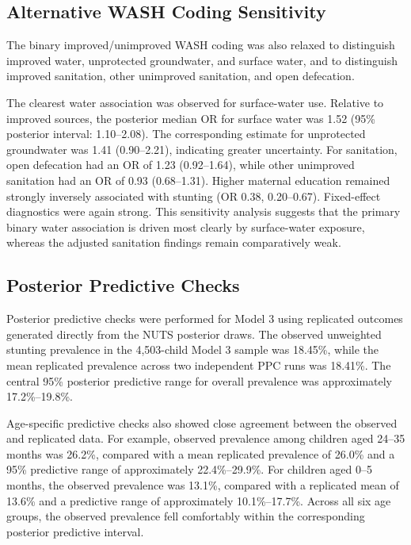 \subsection{Alternative WASH Coding Sensitivity}

The binary improved/unimproved WASH coding was also relaxed to distinguish improved water, unprotected groundwater, and surface water, and to distinguish improved sanitation, other unimproved sanitation, and open defecation.

The clearest water association was observed for surface-water use. Relative to improved sources, the posterior median OR for surface water was 1.52 (95\% posterior interval: 1.10--2.08). The corresponding estimate for unprotected groundwater was 1.41 (0.90--2.21), indicating greater uncertainty. For sanitation, open defecation had an OR of 1.23 (0.92--1.64), while other unimproved sanitation had an OR of 0.93 (0.68--1.31). Higher maternal education remained strongly inversely associated with stunting (OR 0.38, 0.20--0.67). Fixed-effect diagnostics were again strong. This sensitivity analysis suggests that the primary binary water association is driven most clearly by surface-water exposure, whereas the adjusted sanitation findings remain comparatively weak.

\subsection{Posterior Predictive Checks}

Posterior predictive checks were performed for Model 3 using replicated outcomes generated directly from the NUTS posterior draws. The observed unweighted stunting prevalence in the 4,503-child Model 3 sample was 18.45\%, while the mean replicated prevalence across two independent PPC runs was 18.41\%. The central 95\% posterior predictive range for overall prevalence was approximately 17.2\%--19.8\%.

Age-specific predictive checks also showed close agreement between the observed and replicated data. For example, observed prevalence among children aged 24--35 months was 26.2\%, compared with a mean replicated prevalence of 26.0\% and a 95\% predictive range of approximately 22.4\%--29.9\%. For children aged 0--5 months, the observed prevalence was 13.1\%, compared with a replicated mean of 13.6\% and a predictive range of approximately 10.1\%--17.7\%. Across all six age groups, the observed prevalence fell comfortably within the corresponding posterior predictive interval.


